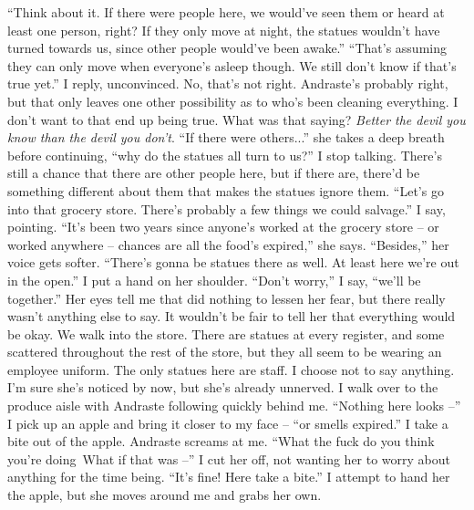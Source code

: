 \documentclass[a4paper, 12pt]{book}
\newcommand\tab[1][1cm]{\hspace*{#1}}
\begin{document}
\newline
\tab
``Think about it. If there were people here, we would’ve seen them or heard at least one person, right? If they only move at night, the statues wouldn’t have turned towards us, since other people would’ve been awake.''
\newline
\tab
``That’s assuming they can only move when everyone’s asleep though. We still don’t know if that’s true yet.'' I reply, unconvinced. No, that’s not right. Andraste’s probably right, but that only leaves one other possibility as to who’s been cleaning everything. I don’t want to that end up being true. What was that saying? \textit{Better the devil you know than the devil you don’t}.
\newline
\tab
``If there were others...'' she takes a deep breath before continuing, ``why do the statues all turn to us?'' I stop talking. There’s still a chance that there are other people here, but if there are, there’d be something different about them that makes the statues ignore them.
\newline
\tab
``Let’s go into that grocery store. There’s probably a few things we could salvage.'' I say, pointing.
\newline
\tab
``It’s been two years since anyone’s worked at the grocery store -- or worked anywhere -- chances are all the food’s expired,'' she says. ``Besides,'' her voice gets softer. ``There’s gonna be statues there as well. At least here we’re out in the open.''
\newline
\tab
I put a hand on her shoulder. ``Don’t worry,'' I say, ``we’ll be together.'' Her eyes tell me that did nothing to lessen her fear, but there really wasn’t anything else to say. It wouldn’t be fair to tell her that everything would be okay. We walk into the store. There are statues at every register, and some scattered throughout the rest of the store, but they all seem to be wearing an employee uniform. The only statues here are staff. I choose not to say anything. I’m sure she’s noticed by now, but she’s already unnerved. I walk over to the produce aisle with Andraste following quickly behind me. ``Nothing here looks --'' I pick up an apple and bring it closer to my face -- ``or smells expired.''
\newline
\tab
I take a bite out of the apple. Andraste screams at me. ``What the fuck do you think you’re doing\textinterrobang\, What if that was --'' I cut her off, not wanting her to worry about anything for the time being.
\newline
\tab
``It’s fine! Here take a bite.'' I attempt to hand her the apple, but she moves around me and grabs her own.
\end{document}
